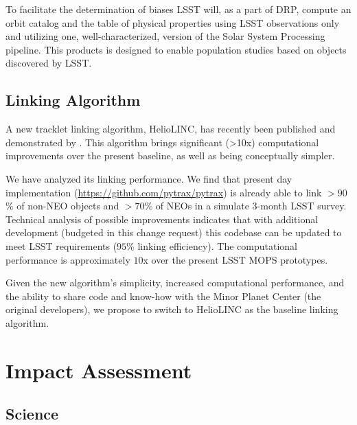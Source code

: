 \documentclass[DM,authoryear,toc]{lsstdoc}
\begin{document}
To facilitate the determination of biases LSST will, as a part of DRP, compute an orbit catalog and the table of physical properties using LSST observations only and utilizing one, well-characterized, version of the Solar System Processing pipeline. This products is designed to enable population studies based on objects discovered by LSST.

\subsection{Linking Algorithm}

A new tracklet linking algorithm, HelioLINC, has recently been published and demonstrated by \cite{2018AJ....156..135H}. This algorithm brings significant (>10x) computational improvements over the present baseline, as well as being conceptually simpler.

We have analyzed its linking performance. We find that present day implementation (\url{https://github.com/pytrax/pytrax}) is already able to link $> 90$\% of non-NEO objects and $> 70$\% of NEOs in a simulate 3-month LSST survey. Technical analysis of possible improvements indicates that with additional development (budgeted in this change request) this codebase can be updated to meet LSST requirements ($95$\% linking efficiency). The computational performance is approximately $10$x over the present LSST MOPS prototypes.

Given the new algorithm's simplicity, increased computational performance, and the ability to share code and know-how with the Minor Planet Center (the original developers), we propose to switch to HelioLINC as the baseline linking algorithm.

\section{Impact Assessment}

\subsection{Science}
\end{document}
